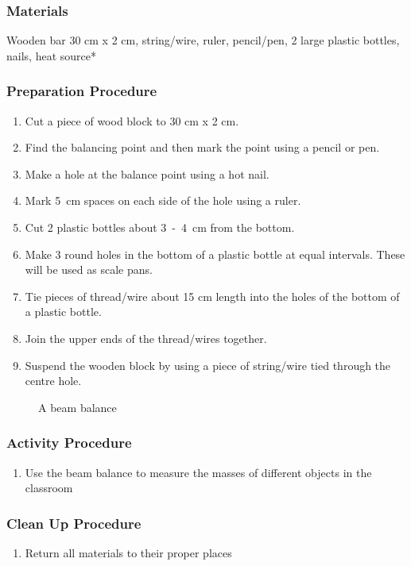 \subsubsection*{Materials}
Wooden bar 30 cm x 2 cm, string/wire, ruler, pencil/pen, 2 large plastic bottles, nails, heat source*

\subsubsection*{Preparation Procedure}
\begin{enumerate}
\item{Cut a piece of wood block to 30 cm x 2 cm.} 
\item{Find the balancing point and then mark the point using a pencil or pen.} 
\item{Make a hole at the balance point using a hot nail.} 
\item{Mark 5~cm spaces on each side of the hole using a ruler.} 
\item{Cut 2 plastic bottles about 3~-~4~cm from the bottom.} 
\item{Make 3 round holes in the bottom of a plastic bottle at equal intervals. These will be used as scale pans.} 
\item{Tie pieces of thread/wire about 15 cm length into the holes of the bottom of a plastic bottle.} 
\item{Join the upper ends of the thread/wires together.} 
\item{Suspend the wooden block by using a piece of string/wire tied through the centre hole.} 
\end{enumerate}

\begin{figure}
\begin{center}
\def\svgwidth{350pt}

\caption{A beam balance}
\label{fig:beam-balance}
\end{center}
\end{figure}

\subsubsection*{Activity Procedure}
\begin{enumerate}
\item{Use the beam balance to measure the masses of different objects in the classroom}
\end{enumerate}

\subsubsection*{Clean Up Procedure}
\begin{enumerate}
\item{Return all materials to their proper places}
\end{enumerate}

